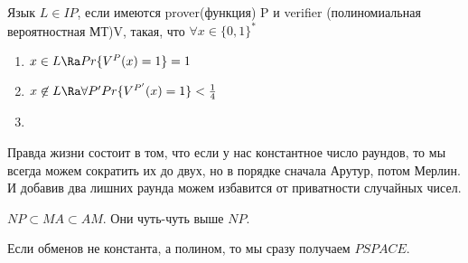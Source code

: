 \begin{Def}
Язык $L \in IP$, если имеются prover(функция) P и verifier 
(полиномиальная вероятностная МТ)V, такая, что $\forall x \in \{0, 1\}^{*}$\\
\begin{enumerate}
\item 
$x \in L \Ra Pr\{V^{P}(x) = 1\} = 1$\\
\item 
$x \not \in L \Ra \forall P' Pr\{V^{P'}(x) = 1\} < \frac{1}{4}$\\
\item 
\end{enumerate}
\end{Def}


Правда жизни состоит в том, что если у нас константное число 
раундов, то мы всегда можем сократить их до 
двух, но в порядке сначала Арутур, потом Мерлин. И добавив два лишних
раунда можем избавится от приватности случайных чисел. 

$NP \subset MA \subset AM$. Они чуть-чуть выше $NP$.

Если обменов не константа, а полином, то мы сразу получаем $PSPACE$.